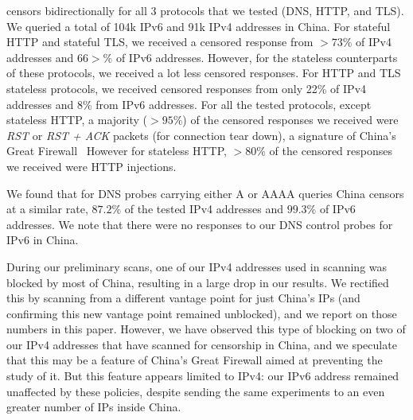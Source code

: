 censors bidirectionally for all 3 protocols that we tested (DNS, HTTP, and TLS).
We queried a total of 104k IPv6 and 91k IPv4 addresses in China. For stateful
HTTP and stateful TLS, we received a censored response from  $>73\%$ of IPv4
addresses and $66>\%$ of IPv6 addresses. However, for the stateless counterparts
of these protocols, we received a lot less censored responses. For HTTP and TLS
stateless protocols, we received censored responses from only 22\% of IPv4
addresses and 8\% from IPv6 addresses. For all the tested protocols, except
stateless HTTP, a majority ($>95\%$) of the censored responses we received were
\textit{RST} or \textit{RST + ACK} packets (for connection tear down), a
signature of China's Great
Firewall~\cite{bock2019geneva,wang2017your,weaponizing-middleboxes}
However for stateless HTTP, $>80\%$ of the censored responses we received were HTTP injections.


We found that for DNS probes carrying either A or AAAA queries China censors at
a similar rate, $87.2\%$ of the tested IPv4 addresses and $99.3\%$ of IPv6
addresses. We note that there were no responses to our DNS control probes for
IPv6 in China.

During our preliminary scans, one of our IPv4 addresses used in
scanning was blocked by most of China, resulting in a large drop in our results. We
rectified this by scanning from a different vantage point for just China's IPs
(and confirming this new vantage point remained unblocked), and we report on
those numbers in this paper. However, we have observed this type of blocking on
two of our IPv4 addresses that have scanned for censorship in China, and we speculate that
this may be a
feature of China's Great Firewall aimed at preventing the study of it. But this
feature appears limited to IPv4: our IPv6 address remained unaffected by these policies,
despite sending the same experiments to an even greater number of IPs inside
China.


